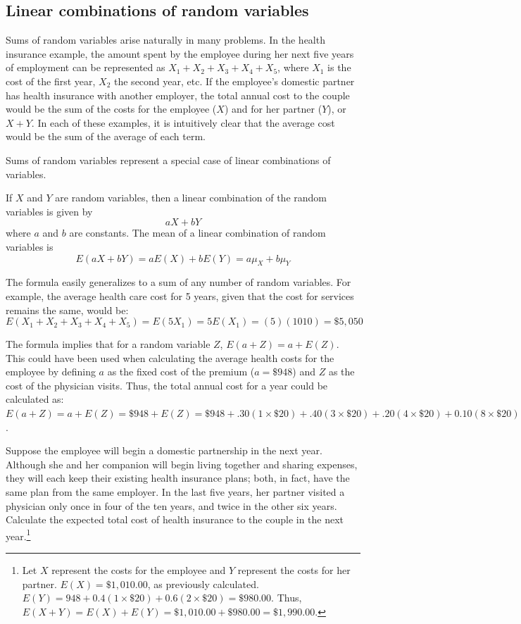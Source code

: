 \subsection{Linear combinations of random variables}

Sums of random variables arise naturally in many problems. In the health insurance example, the amount spent by the employee during her next five years of employment can be represented as $X_1 + X_2 + X_3 + X_4 + X_5$, where $X_1$ is the cost of the first year, $X_2$ the second year, etc. If the employee's domestic partner has health insurance with another employer, the total annual cost to the couple would be the sum of the costs for the employee ($X$) and for her partner ($Y$), or $X + Y$. In each of these examples, it is intuitively clear that the average cost would be the sum of the average of each term.

Sums of random variables represent a special case of linear combinations of variables.  

\begin{termBox}{
		If $X$ and $Y$ are random variables, then a linear combination of the random variables is given by
		\[aX + bY\] \label{linComboOfRandomVariablesXAndY}
		where $a$ and $b$ are constants.  The mean of a linear combination of random variables is 
		\[E(aX + bY) = aE(X) + bE(Y) = a\mu_X + b\mu_Y\] }
\end{termBox}

The formula easily generalizes to a sum of any number of random variables. For example, the average health care cost for 5 years, given that the cost for services remains the same, would be: 
\[E(X_1 + X_2 + X_3 + X_4 + X_5) = E(5 X_1) = 5E(X_1) =(5)(1010) = \$5,050\]

The formula implies that for a random variable $Z$, $E(a + Z) = a + E(Z)$.  This could have been used when calculating the average health costs for the employee by defining $a$ as the fixed cost of the premium ($a=\$948$) and $Z$ as the cost of the physician visits. Thus, the total annual cost for a year could be calculated as: $E(a + Z) = a + E(Z) = \$948 + E(Z) = \$948 + .30(1 \times \$20) + .40(3 \times \$20) + .20(4 \times \$20) + 0.10(8 \times \$20)= \$1,010.00$. 

\begin{exercise} \label{healthCareCostsPartner}
	Suppose the employee will begin a domestic partnership in the next year. Although she and her companion will begin living together and sharing expenses, they will each keep their existing health insurance plans; both, in fact, have the same plan from the same employer. In the last five years, her partner visited a physician only once in four of the ten years, and twice in the other six years. Calculate the expected total cost of health insurance to the couple in the next year.\footnote{Let $X$ represent the costs for the employee and $Y$ represent the costs for her partner. $E(X) = \$1,010.00$, as previously calculated. $E(Y) = 948 + 0.4(1 \times \$20) + 0.6(2 \times \$20) = \$980.00$. Thus, $E(X + Y) = E(X) + E(Y) = \$1,010.00 + \$980.00 = \$1,990.00$.}
\end{exercise}

